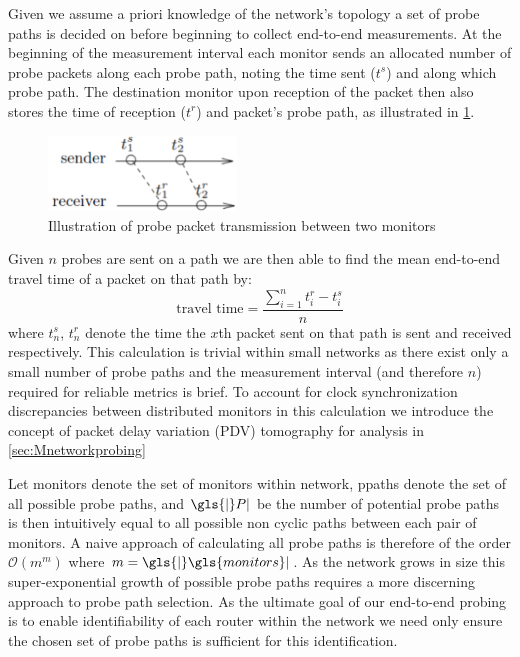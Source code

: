     Given we assume a priori knowledge of the network's topology a set of probe paths is decided on before beginning to collect end-to-end measurements. At the beginning of the measurement interval each monitor sends an allocated number of probe packets along each probe path, noting the time sent ($t^s$) and along which probe path. The destination monitor upon reception of the packet then also stores the time of reception ($t^r$) and packet's probe path, as illustrated in \ref{fig:pptransmission}. 
    \begin{figure}[H]
        \centering
        \includegraphics[width=5cm]{figs/background/probe_transmission.png}
        \caption[Illustration of probe packet transmission between two monitors]{Illustration of probe packet transmission between two monitors \protect\cite{he_fisher_2015}}
        \label{fig:pptransmission}
    \end{figure}
    \noindent Given $n$ probes are sent on a path we are then able to find the mean end-to-end travel time of a packet on that path by: \[\text{travel time}=\frac{\sum_{i=1}^nt_i^r - t_i^s}{n}\] where $t_n^s$, $t_n^r$ denote the time the $x$th packet sent on that path is sent and received respectively. This calculation is trivial within small networks as there exist only a small number of probe paths and the measurement interval (and therefore $n$) required for reliable metrics is brief. To account for clock synchronization discrepancies between distributed monitors in this calculation we introduce the concept of packet delay variation (PDV) tomography for analysis in \cref{sec:Mnetworkprobing} \par

    Let \gls{monitors} denote the set of monitors within \gls{network}, \gls{ppaths} denote the set of all possible probe paths, and $\gls{|}P|$ be the number of potential probe paths  is then intuitively equal to all possible non cyclic paths between each pair of monitors. A naive approach of calculating all probe paths is therefore of the order $\mathcal{O}(m^m)$ where $m=\gls{|}\gls{monitors}|$. As the network grows in size this super-exponential growth of possible probe paths requires a more discerning approach to probe path selection. As the ultimate goal of our end-to-end probing is to enable identifiability of each router within the network we need only ensure the chosen set of probe paths is sufficient for this identification.\par
    
